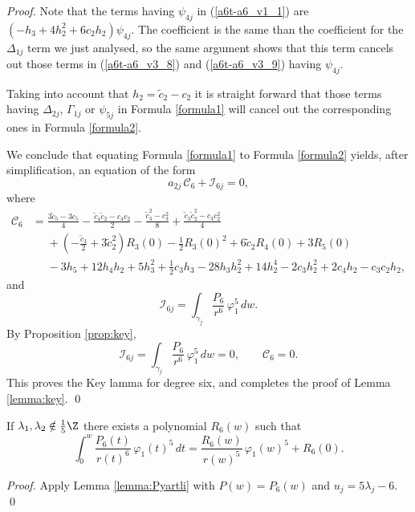 \begin{proof}
Note that the terms having $\psi_{4j}$ in (\ref{a6t-a6_v1_1}) are $(-h_3+4h_2^2+6c_2h_2)\psi_{4j}$. The coefficient is the same than the coefficient for the $\Delta_{1j}$ term we just analysed, so the same argument shows that this term cancels out those terms in (\ref{a6t-a6_v3_8}) and (\ref{a6t-a6_v3_9}) having $\psi_{4j}$.

Taking into account that $h_2=\tilde{c}_2-c_2$ it is straight forward that those terms having $\Delta_{2j}$, $\Gamma_{1j}$ or $\psi_{5j}$ in Formula \ref{formula1} will cancel out the corresponding ones in Formula \ref{formula2}.

We conclude that equating Formula \ref{formula1} to Formula \ref{formula2} yields, after simplification, an equation of the form
\[ a_{2j}\,\mathcal{C}_6+\mathcal{I}_{6j}=0, \]
where
\begin{align*}
\mathcal{C}_6 &= \frac{3\tilde{c}_5-3c_5}{4}-\frac{\tilde{c}_4\tilde{c}_2-c_4c_2}{2}-\frac{\tilde{c}_3^2-c_3^2}{8}+\frac{\tilde{c}_3\tilde{c}_2^2-c_3c_2^2}{4} \\
&\phantom{=} +\left(-\frac{\tilde{c}_3}{2}+3\tilde{c}_2^2\right)R_3(0)-\frac{1}{2}R_3(0)^2+6\tilde{c}_2R_4(0)+3R_5(0)\\
&\phantom{=} -3h_5+12h_4h_2+5h_3^2+\frac{1}{2}c_3h_3-28h_3h_2^2+14h_2^4-2c_3h_2^2+2c_4h_2-c_3c_2h_2,
\end{align*}
and
\[ \mathcal{I}_{6j}=\int_{\gamma_j}\frac{P_6}{r^6}\,\varphi_1^5\,dw. \]
By Proposition \ref{prop:key},
\[ \mathcal{I}_{6j}=\int_{\gamma_j}\frac{P_6}{r^6}\,\varphi_1^5\,dw=0, \qquad \mathcal{C}_6=0. \]
This proves the Key lamma for degree six, and completes the proof of Lemma \ref{lemma:key}.
\qed\end{proof}

\begin{proposition}\label{prop:R6}
If $\lambda_1,\lambda_2\notin\frac{1}{5}\Z$ there exists a polynomial $R_6(w)$ such that 
\[ \int_{0}^{w}\frac{P_6(t)}{r(t)^6}\,\varphi_1(t)^5\,dt=\frac{R_6(w)}{r(w)^5}\,\varphi_1(w)^5+R_6(0). \]
\end{proposition}

\begin{proof}
 Apply Lemma \ref{lemma:Pyartli} with $P(w)=P_6(w)$ and $u_j=5\lambda_j-6$.
\qed\end{proof}











































